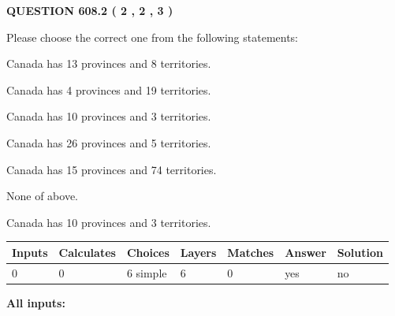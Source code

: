 \documentclass[12pt]{article}
\begin{document}
   
  
\vspace{0.2in}
  
{\textbf{\Large{QUESTION
608.2 
 ( 2 , 2 , 3 )
}}}
  
  
Please choose the correct one from the following statements:
 
 
Canada has  13 provinces and  8 territories.
 
 
Canada has   4 provinces and  19 territories.
 
 
Canada has 10  provinces and 3 territories.
 
 
Canada has  26 provinces and  5 territories.
 
 
Canada has  15 provinces and  74 territories.
 
 
 None of above.
 
 
\noindent{}
 
 
Canada has 10  provinces and 3 territories.
 
 
\noindent{}
 
 
   
   
   
   
\noindent\begin{tabular}{|l|l|l|l|l|l|l|}
 \hline
Inputs & Calculates & Choices & Layers & Matches & Answer & Solution \\ \hline
 0  & 
 0  & 
 6
  simple  
  & 
 6  & 
 0  & 
  yes & 
  no 
  \\ \hline
 \end{tabular}
   
   
   
   
\noindent{}
   
   
   
   
\noindent\vspace{0.1in}\hspace{-0.08in} {\textbf{\Large{All inputs: }}}
   
   
   
   
   
   
 \vspace{0.2in}
 
\end{document}
